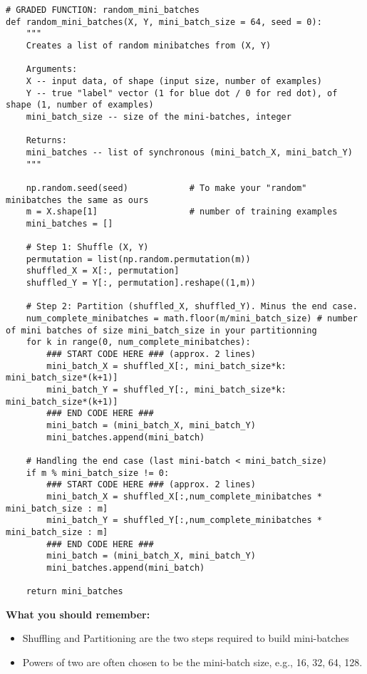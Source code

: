 {\begin{verbatim}
# GRADED FUNCTION: random_mini_batches
def random_mini_batches(X, Y, mini_batch_size = 64, seed = 0):
    """
    Creates a list of random minibatches from (X, Y)
    
    Arguments:
    X -- input data, of shape (input size, number of examples)
    Y -- true "label" vector (1 for blue dot / 0 for red dot), of shape (1, number of examples)
    mini_batch_size -- size of the mini-batches, integer
    
    Returns:
    mini_batches -- list of synchronous (mini_batch_X, mini_batch_Y)
    """
    
    np.random.seed(seed)            # To make your "random" minibatches the same as ours
    m = X.shape[1]                  # number of training examples
    mini_batches = []
        
    # Step 1: Shuffle (X, Y)
    permutation = list(np.random.permutation(m))
    shuffled_X = X[:, permutation]
    shuffled_Y = Y[:, permutation].reshape((1,m))

    # Step 2: Partition (shuffled_X, shuffled_Y). Minus the end case.
    num_complete_minibatches = math.floor(m/mini_batch_size) # number of mini batches of size mini_batch_size in your partitionning
    for k in range(0, num_complete_minibatches):
        ### START CODE HERE ### (approx. 2 lines)
        mini_batch_X = shuffled_X[:, mini_batch_size*k: mini_batch_size*(k+1)]
        mini_batch_Y = shuffled_Y[:, mini_batch_size*k: mini_batch_size*(k+1)]
        ### END CODE HERE ###
        mini_batch = (mini_batch_X, mini_batch_Y)
        mini_batches.append(mini_batch)
    
    # Handling the end case (last mini-batch < mini_batch_size)
    if m % mini_batch_size != 0:
        ### START CODE HERE ### (approx. 2 lines)
        mini_batch_X = shuffled_X[:,num_complete_minibatches * mini_batch_size : m]
        mini_batch_Y = shuffled_Y[:,num_complete_minibatches * mini_batch_size : m]
        ### END CODE HERE ###
        mini_batch = (mini_batch_X, mini_batch_Y)
        mini_batches.append(mini_batch)
    
    return mini_batches
\end{verbatim}

{\color{red}\textbf{What you should remember:}
\begin{itemize}
\item Shuffling and Partitioning are the two steps required to build mini-batches
\item Powers of two are often chosen to be the mini-batch size, e.g., 16, 32, 64, 128.
\end{itemize}
}



}
